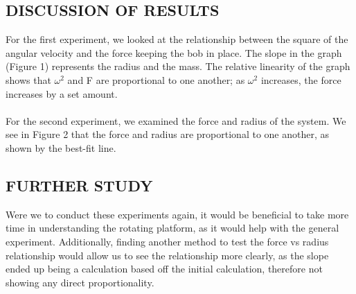 \documentclass [12pt, letterpaper, twoside] {article}
\begin{document}
\subsection* {DISCUSSION OF RESULTS}
For the first experiment, we looked at the relationship between the square of the angular velocity and the force keeping the bob in place. The slope in the graph (Figure 1) represents the radius and the mass. The relative linearity of the graph shows that \(\omega^2\) and F are proportional to one another; as \(\omega^2\) increases, the force increases by a set amount. \\\\
For the second experiment, we examined the force and radius of the system. We see in Figure 2 that the force and radius are proportional to one another, as shown by the best-fit line.

\subsection* {FURTHER STUDY}
Were we to conduct these experiments again, it would be beneficial to take more time in understanding the rotating platform, as it would help with the general experiment. Additionally, finding another method to test the force vs radius relationship would allow us to see the relationship more clearly, as the slope ended up being a calculation based off the initial calculation, therefore not showing any direct proportionality.
\end{document}
